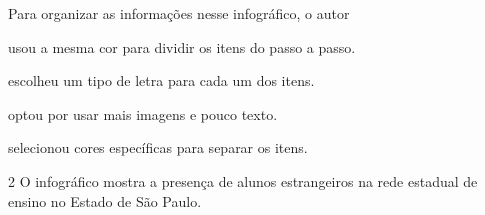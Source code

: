 
Para organizar as informações nesse infográfico, o autor

\begin{boxlist}
\item usou a mesma cor para dividir os itens do passo a passo.

\item escolheu um tipo de letra para cada um dos itens.

\item optou por usar mais imagens e pouco texto.

\item selecionou cores específicas para separar os itens.
\end{boxlist}

\num{2} O infográfico mostra a presença de alunos estrangeiros na rede
estadual de ensino no Estado de São Paulo.

